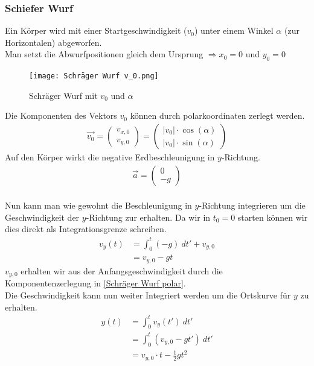 \documentclass{article}
\begin{document}
\subsubsection{Schiefer Wurf}
Ein Körper wird mit einer Startgeschwindigkeit ($v_0$) unter einem Winkel $\alpha$ (zur Horizontalen) abgeworfen.\\
Man setzt die Abwurfpositionen gleich dem Ursprung $\Rightarrow x_0=0$ und $y_0=0$
\begin{figure}[H]  %
    \centering      %
    \texttt{[image: Schräger Wurf v\_0.png]} %
    \caption{Schräger Wurf mit $v_0$ und $\alpha$} %
    \label{fig:Schräger Wurf} %
\end{figure}
\noindent Die Komponenten des Vektors $v_0$ können durch polarkoordinaten zerlegt werden.
\begin{align}
    \vec{v_0}=\left(\begin{matrix}
        v_{x,0}\\v_{y,0}
    \end{matrix}\right)
    =\left(\begin{matrix}
        |v_0|\cdot \cos(\alpha)\\
        |v_0|\cdot \sin(\alpha)
    \end{matrix}\right)\label{Schräger Wurf polar}
\end{align}
Auf den Körper wirkt die negative Erdbeschleunigung in $y$-Richtung.
\begin{align}
    \vec{a}=\left(\begin{matrix}
        0\\-g
    \end{matrix}\right)
\end{align}\\
Nun kann man wie gewohnt die Beschleunigung in $y$-Richtung integrieren um die Geschwindigkeit der $y$-Richtung zur erhalten. Da wir in $t_0=0$ starten können wir dies direkt als Integrationsgrenze schreiben.
\begin{align}
    v_y(t)&=\int_{0}^{t}(-g)\ dt' + v_{y,0}\\
    &=v_{y,0}-gt
\end{align}
$v_{y,0}$ erhalten wir aus der Anfangsgeschwindigkeit durch die Komponentenzerlegung in \ref{Schräger Wurf polar}.\\
Die Geschwindigkeit kann nun weiter Integriert werden um die Ortskurve für $y$ zu erhalten.
\begin{align}
    y(t)&=\int_{0}^{t}v_y(t')\ dt'\\
    &=\int_{0}^{t}(v_{y,0}-gt')\ dt'\\
    &=v_{y,0}\cdot t-\frac{1}{2}gt^2
\end{align}
\end{document}
